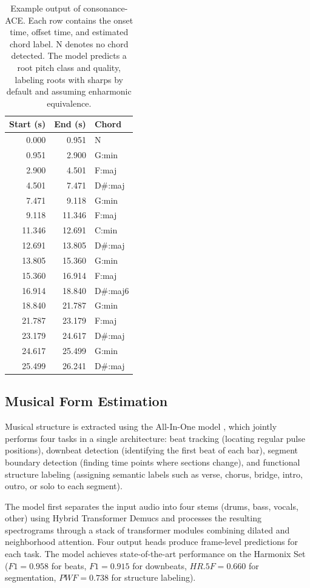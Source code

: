 \documentclass{article}
\begin{document}
\begin{table}[ht]
\centering
\footnotesize
\begin{tabular}{rrl}
\toprule
\textbf{Start (s)} & \textbf{End (s)} & \textbf{Chord} \\
\midrule
0.000 & 0.951 & N \\
0.951 & 2.900 & G:min \\
2.900 & 4.501 & F:maj \\
4.501 & 7.471 & D\#:maj \\
7.471 & 9.118 & G:min \\
9.118 & 11.346 & F:maj \\
11.346 & 12.691 & C:min \\
12.691 & 13.805 & D\#:maj \\
13.805 & 15.360 & G:min \\
15.360 & 16.914 & F:maj \\
16.914 & 18.840 & D\#:maj6 \\
18.840 & 21.787 & G:min \\
21.787 & 23.179 & F:maj \\
23.179 & 24.617 & D\#:maj \\
24.617 & 25.499 & G:min \\
25.499 & 26.241 & D\#:maj \\
\bottomrule
\end{tabular}
\caption{Example output of consonance-ACE. Each row contains the onset time, offset time, and estimated chord label. N denotes no chord detected. The model predicts a root pitch class and quality, labeling roots with sharps by default and assuming enharmonic equivalence.}
\label{tab:ace_output}
\end{table}

\subsection{Musical Form Estimation}
\label{sec:form_pipeline}
Musical structure is extracted using the All-In-One model \citep{taejun2023allinone}, which jointly performs four tasks in a single architecture: beat tracking (locating regular pulse positions), downbeat detection (identifying the first beat of each bar), segment boundary detection (finding time points where sections change), and functional structure labeling (assigning semantic labels such as verse, chorus, bridge, intro, outro, or solo to each segment).

The model first separates the input audio into four stems (drums, bass, vocals, other) using Hybrid Transformer Demucs \citep{rouard2023hybrid} and processes the resulting spectrograms through a stack of transformer modules combining dilated and neighborhood attention. Four output heads produce frame-level predictions for each task. The model achieves state-of-the-art performance on the Harmonix Set ($F1 = 0.958$ for beats, $F1 = 0.915$ for downbeats, $HR.5F = 0.660$ for segmentation, $PWF = 0.738$ for structure labeling).
\end{document}

